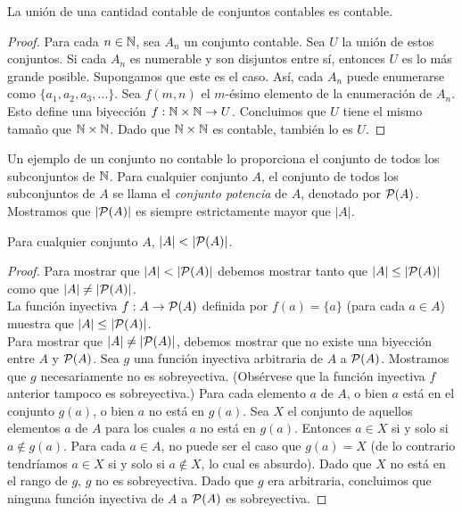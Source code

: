 \documentclass[12pt,a4paper]{book}
\begin{document}
    \begin{proposicion}\label{prop:union-contable-contable}
        La unión de una cantidad contable de conjuntos contables es contable.
    \end{proposicion}
    \begin{proof}
        Para cada $n\in\mathbb{N}$, sea $A_{n}$ un conjunto contable. Sea $U$ la unión de estos conjuntos. Si cada $A_{n}$ es
        numerable y son disjuntos entre sí, entonces $U$ es lo más grande posible. Supongamos que este es el caso. Así,
        cada $A_{n}$ puede enumerarse como $\{a_{1},a_{2},a_{3},\dots\}$. Sea $f(m,n)$ el $m$-ésimo elemento de la
        enumeración de $A_{n}$. Esto define una biyección $f:\mathbb{N}\times\mathbb{N}\rightarrow U$. Concluimos que $U$ tiene el mismo
        tamaño que $\mathbb{N}\times\mathbb{N}$. Dado que $\mathbb{N}\times\mathbb{N}$ es contable, también lo es $U$.
    \end{proof}

    Un ejemplo de un conjunto no contable lo proporciona el conjunto de todos los subconjuntos de $\mathbb{N}$. Para cualquier
    conjunto $A$, el conjunto de todos los subconjuntos de $A$ se llama el \textit{conjunto potencia} de $A$, denotado por
    $\mathcal{P}(A)$. Mostramos que $|\mathcal{P}(A)|$ es siempre estrictamente mayor que $|A|$.

    \begin{proposicion}\label{prop:potencia-mas-grande}
        Para cualquier conjunto $A$, $|A|<|\PP(A)|$.
    \end{proposicion}
    \begin{proof}
        Para mostrar que $|A|<|\PP(A)|$ debemos mostrar tanto que $|A|\leq|\mathcal{P}(A)|$ como que $|A|\neq|\mathcal{P}(A)|$.\\
        La función inyectiva $f:A\rightarrow\mathcal{P}(A)$ definida por $f(a)=\{a\}$ (para cada $a\in A$) muestra que
        $|A|\leq|\mathcal{P}(A)|$.\\
        Para mostrar que $|A|\neq|\mathcal{P}(A)|$, debemos mostrar que no existe una biyección entre $A$ y $\mathcal{P}(A)$. Sea $g$ una
        función inyectiva arbitraria de $A$ a $\mathcal{P}(A)$. Mostramos que $g$ necesariamente no es sobreyectiva. (Obsérvese que
        la función inyectiva $f$ anterior tampoco es sobreyectiva.) Para cada elemento $a$ de $A$, o bien $a$ está en el
        conjunto $g(a)$, o bien $a$ no está en $g(a)$. Sea $X$ el conjunto de aquellos elementos $a$ de $A$ para los cuales
        $a$ no está en $g(a)$. Entonces $a\in X$ si y solo si $a\notin g(a)$. Para cada $a\in A$, no puede ser el caso que
        $g(a)=X$ (de lo contrario tendríamos $a\in X$ si y solo si $a\notin X$, lo cual es absurdo). Dado que $X$ no está
        en el rango de $g$, $g$ no es sobreyectiva. Dado que $g$ era arbitraria, concluimos que ninguna función inyectiva de
        $A$ a $\mathcal{P}(A)$ es sobreyectiva.
    \end{proof}
\end{document}
